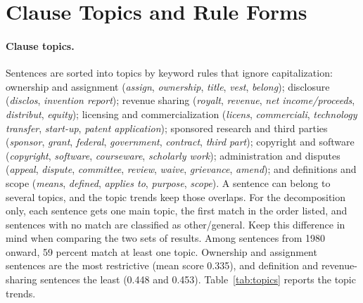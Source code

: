 \documentclass[11pt]{article}
\begin{document}



\section{Clause Topics and Rule Forms}\label{app:topics}
\setcounter{table}{0}

\paragraph{Clause topics.} Sentences are sorted into topics by keyword rules that ignore capitalization: ownership and assignment (\emph{assign}, \emph{ownership}, \emph{title}, \emph{vest}, \emph{belong}); disclosure (\emph{disclos}, \emph{invention report}); revenue sharing (\emph{royalt}, \emph{revenue}, \emph{net income/proceeds}, \emph{distribut}, \emph{equity}); licensing and commercialization (\emph{licens}, \emph{commerciali}, \emph{technology transfer}, \emph{start-up}, \emph{patent application}); sponsored research and third parties (\emph{sponsor}, \emph{grant}, \emph{federal}, \emph{government}, \emph{contract}, \emph{third part}); copyright and software (\emph{copyright}, \emph{software}, \emph{courseware}, \emph{scholarly work}); administration and disputes (\emph{appeal}, \emph{dispute}, \emph{committee}, \emph{review}, \emph{waive}, \emph{grievance}, \emph{amend}); and definitions and scope (\emph{means}, \emph{defined}, \emph{applies to}, \emph{purpose}, \emph{scope}). A sentence can belong to several topics, and the topic trends keep those overlaps. For the decomposition only, each sentence gets one main topic, the first match in the order listed, and sentences with no match are classified as other/general. Keep this difference in mind when comparing the two sets of results. Among sentences from 1980 onward, 59 percent match at least one topic. Ownership and assignment sentences are the most restrictive (mean score 0.335), and definition and revenue-sharing sentences the least (0.448 and 0.453). Table~\ref{tab:topics} reports the topic trends.
\end{document}
